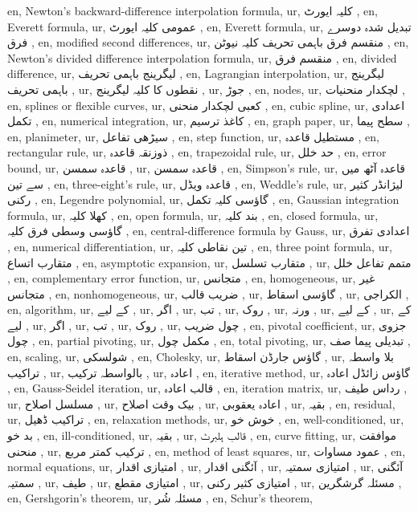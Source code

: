 en, Newton's backward-difference interpolation formula,
ur, کلیہ ایورٹ ,
en, Everett formula,
ur, عمومی کلیہ ایورٹ ,
en, Everett formula,
ur, تبدیل شدہ دوسرے فرق ,
en, modified second differences,
ur, منقسم فرق باہمی تحریف کلیہ نیوٹن ,
en, Newton's divided difference interpolation formula,
ur, منقسم فرق ,
en, divided difference,
ur, لیگرینج باہمی تحریف ,
en, Lagrangian interpolation,
ur, لیگرینج باہمی تحریف ,
ur,  نقطوں کا کلیہ لیگرینج ,
ur, جوڑ ,
en, nodes,
ur, لچکدار منحنیات ,
en, splines or flexible curves,
ur, کعبی لچکدار منحنی ,
en, cubic spline,
ur, اعدادی تکمل ,
en, numerical integration,
ur, کاغذ ترسیم ,
en, graph paper,
ur, سطح پیما ,
en, planimeter,
ur, سیڑھی تفاعل ,
en, step function,
ur, مستطیل قاعدہ ,
en, rectangular rule,
ur, ذوزنقہ قاعدہ ,
en, trapezoidal rule,
ur, حد خلل ,
en, error bound,
ur, قاعدہ سمسن ,
ur, قاعدہ سمسن ,
en, Simpson's rule,
ur, قاعدہ آٹھ میں سے تین ,
en, three-eight's rule,
ur, قاعدہ ویڈل ,
en, Weddle's rule,
ur, لیژانڈر کثیر رکنی ,
en, Legendre polynomial,
ur, گاؤسی کلیہ تکمل ,
en, Gaussian integration formula,
ur, کھلا کلیہ ,
en, open formula,
ur, بند کلیہ ,
en, closed formula,
ur, گاؤسی وسطی فرق کلیہ ,
en, central-difference formula by Gauss,
ur, اعدادی تفرق ,
en, numerical differentiation,
ur, تین نقاطی کلیہ ,
en, three point formula,
ur, متقارب اتساع ,
en, asymptotic expansion,
ur, متقارب تسلسل ,
ur, متمم تفاعل خلل ,
en, complementary error function,
ur, متجانس ,
en, homogeneous,
ur, غیر متجانس ,
en, nonhomogeneous,
ur,  ضریب قالب ,
ur, گاؤسی اسقاط ,
ur, الکراجی ,
en, algorithm,
ur, کے لیے ,
ur, اگر ,
ur, تب ,
ur, روک ,
ur, ورنہ ,
ur, کے لیے ,
ur, کے لیے ,
ur, اگر ,
ur, تب ,
ur, روک ,
ur, چول ضریب  ,
en, pivotal coefficient,
ur, جزوی چول ,
en, partial pivoting,
ur, مکمل چول ,
en, total pivoting,
ur, تبدیلی پیما صف ,
en, scaling,
ur, شولسکی ,
en, Cholesky,
ur, گاؤس جارڈن اسقاط ,
ur, بلا واسطہ تراکیب ,
ur, بالواسطہ ترکیب ,
ur, اعادہ ,
en, iterative method,
ur, گاؤس زائڈل اعادہ ,
en, Gauss-Seidel iteration,
ur, قالب اعادہ ,
en, iteration matrix,
ur, رداس طیف ,
ur, مسلسل اصلاح ,
ur, بیک وقت اصلاح ,
ur, اعادہ یعقوبی ,
ur, بقیہ ,
en, residual,
ur, تراکیب ڈھیل ,
en, relaxation methods,
ur, خوش خو ,
en, well-conditioned,
ur, بد خو ,
en, ill-conditioned,
ur, بقیہ ,
ur, قالب ہلبرٹ ,
en, curve fitting,
ur, موافقت منحنی ,
ur, ترکیب کمتر مربع ,
en, method of least squares,
ur, عمود مساوات ,
en, normal equations,
ur, امتیازی اقدار ,
ur, آئگنی اقدار ,
ur, امتیازی سمتیہ ,
ur, آئگنی سمتیہ ,
ur, طیف ,
ur, امتیازی مقطع ,
ur, امتیازی کثیر رکنی ,
ur, مسئلہ گرشگرین ,
en, Gershgorin's theorem,
ur, مسئلہ شُر ,
en, Schur's theorem,
